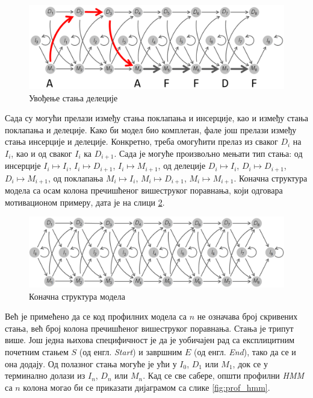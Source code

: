 \documentclass[12pt,oneside]{memoir}
\begin{document}
\begin{CJK}{UTF8}{ipxm}
\begin{figure}[H]
  \centering
  \includegraphics[width=\textwidth]{delecije2.png}
  \caption{Увођење стања делеције\cite{compeau2015}}
  \label{fig:delecije2}
\end{figure}

Сада су могући прелази између стања поклапања и инсерције, као и између стања поклапања и делеције. Како би модел био комплетан, фале још прелази између стања инсерције и делеције. Конкретно, треба омогућити прелаз из сваког $D_i$ на $I_i$, као и од сваког $I_i$ ка $D_{i+1}$. Сада је могуће произвољно мењати тип стања: од инсерције $I_i \mapsto I_i$, $I_i \mapsto D_{i+1}$, $I_i \mapsto M_{i+1}$, од делеције $D_i \mapsto I_i$, $D_i \mapsto D_{i+1}$, $D_i \mapsto M_{i+1}$, од поклапања $M_i \mapsto I_i$, $M_i \mapsto D_{i+1}$, $M_i \mapsto M_{i+1}$. Коначна структура модела са осам колона пречишћеног вишеструког поравнања, који одговара мотивационом примеру, дата је на слици \ref{fig:indeli}.

\begin{figure}[H]
  \centering
  \includegraphics[width=\textwidth]{indeli.png}
  \caption{Коначна структура модела\cite{compeau2015}}
  \label{fig:indeli}
\end{figure}

Већ је примећено да се код профилних модела са $n$ не означава број скривених стања, већ број колона пречишћеног вишеструког поравнања. Стања је трипут више. Још једна њихова специфичност је да је уобичајен рад са експлицитним почетним стањем $S$ (од енгл. \textit{Start}) и завршним $E$ (од енгл. \textit{End}), тако да се и она додају. Од полазног стања могуће је ући у $I_0$, $D_1$ или $M_1$, док се у терминално долази из $I_n$, $D_n$ или $M_n$. Кад се све сабере, општи профилни \textit{HMM} са $n$ колона могао би се приказати дијаграмом са слике \ref{fig:prof_hmm}.


\end{CJK}
\end{document}
